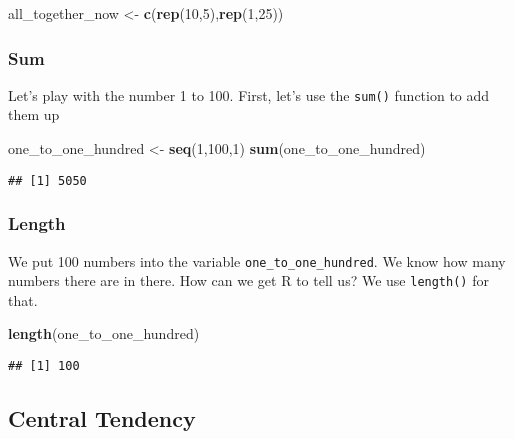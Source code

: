 \documentclass[
]{book}
\newenvironment{Shaded}{\begin{snugshade}}{\end{snugshade}}
\newcommand{\DecValTok}[1]{\textcolor[rgb]{0.00,0.00,0.81}{#1}}
\newcommand{\FunctionTok}[1]{\textcolor[rgb]{0.13,0.29,0.53}{\textbf{#1}}}
\newcommand{\NormalTok}[1]{#1}
\newcommand{\OtherTok}[1]{\textcolor[rgb]{0.56,0.35,0.01}{#1}}
\begin{document}
\begin{Shaded}
\begin{Highlighting}[]
\NormalTok{all\_together\_now }\OtherTok{\textless{}{-}} \FunctionTok{c}\NormalTok{(}\FunctionTok{rep}\NormalTok{(}\DecValTok{10}\NormalTok{,}\DecValTok{5}\NormalTok{),}\FunctionTok{rep}\NormalTok{(}\DecValTok{1}\NormalTok{,}\DecValTok{25}\NormalTok{)) }
\end{Highlighting}
\end{Shaded}

\hypertarget{sum}{%
\subsubsection{Sum}\label{sum}}

Let's play with the number 1 to 100. First, let's use the \texttt{sum()} function to add them up

\begin{Shaded}
\begin{Highlighting}[]
\NormalTok{one\_to\_one\_hundred }\OtherTok{\textless{}{-}} \FunctionTok{seq}\NormalTok{(}\DecValTok{1}\NormalTok{,}\DecValTok{100}\NormalTok{,}\DecValTok{1}\NormalTok{)}
\FunctionTok{sum}\NormalTok{(one\_to\_one\_hundred)}
\end{Highlighting}
\end{Shaded}

\begin{verbatim}
## [1] 5050
\end{verbatim}

\hypertarget{length}{%
\subsubsection{Length}\label{length}}

We put 100 numbers into the variable \texttt{one\_to\_one\_hundred}. We know how many numbers there are in there. How can we get R to tell us? We use \texttt{length()} for that.

\begin{Shaded}
\begin{Highlighting}[]
\FunctionTok{length}\NormalTok{(one\_to\_one\_hundred)}
\end{Highlighting}
\end{Shaded}

\begin{verbatim}
## [1] 100
\end{verbatim}

\hypertarget{central-tendency}{%
\subsection{Central Tendency}\label{central-tendency}}
\end{document}

